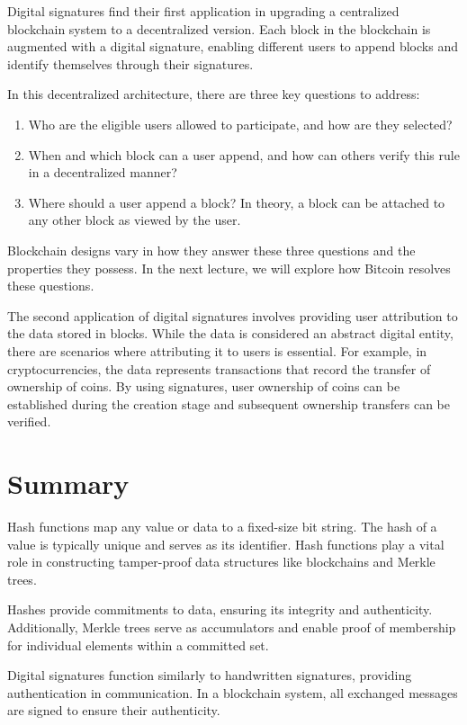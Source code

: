 Digital signatures find their first application in upgrading a centralized blockchain system to a decentralized version. Each block in the blockchain is augmented with a digital signature, enabling different users to append blocks and identify themselves through their signatures.

In this decentralized architecture, there are three key questions to address:
\begin{enumerate}
	\item { Who are the eligible users allowed to participate, and how are they selected?}
	\item {When and which block can a user append, and how can others verify this rule in a decentralized manner?}
	\item {Where should a user append a block? In theory, a block can be attached to any other block as viewed by the user.}
\end{enumerate} 


Blockchain designs vary in how they answer these three questions and the properties they possess. In the next lecture, we will explore how Bitcoin resolves these questions.

The second application of digital signatures involves providing user attribution to the data stored in blocks. While the data is considered an abstract digital entity, there are scenarios where attributing it to users is essential. For example, in cryptocurrencies, the data represents transactions that record the transfer of ownership of coins. By using signatures, user ownership of coins can be established during the creation stage and subsequent ownership transfers can be verified.

\section{Summary}
Hash functions map any value or data to a fixed-size bit string. The hash of a value is typically unique and serves as its identifier. Hash functions play a vital role in constructing tamper-proof data structures like blockchains and Merkle trees.

Hashes provide commitments to data, ensuring its integrity and authenticity. Additionally, Merkle trees serve as accumulators and enable proof of membership for individual elements within a committed set.

Digital signatures function similarly to handwritten signatures, providing authentication in communication. In a blockchain system, all exchanged messages are signed to ensure their authenticity.

